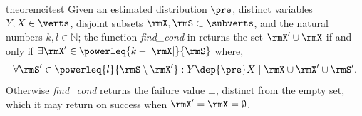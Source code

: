 \documentclass[accepted]{uai2026} %
\theoremstyle{plain}
\theoremstyle{definition}
\theoremstyle{remark}
\begin{document}
\begin{algorithm}[t]
  \caption{Association Mining}\label{alg:assoc-mine}
\end{algorithm}


\begin{restatable}{theorem}{citest}
  \label{thm:citest}
  Given an estimated distribution $\pre$, distinct variables
  $Y,X\in\verts$, disjoint subsets $\rmX,\rmS\subset\subverts$, and the
  natural numbers $k,l\in\mathbb{N}$; the function
  \textit{find\_cond} in  returns the set
  $\rmX'\cup\rmX$ if and only if
  $\exists \rmX' \in \powerleq{k-|\rmX|}{\rmS}$ where,
  \begin{equation}
    \label{eq:25}
    \forall \rmS' \in \powerleq{l}{\rmS \setminus \rmX'} :
    Y \dep{\pre} X \mid \rmX \cup \rmX' \cup \rmS'.
  \end{equation}
  Otherwise \textit{find\_cond} returns the failure value $\bot$,
  distinct from the empty set, which it may return on success when
  $\rmX'=\rmX=\emptyset$.
\end{restatable}
\end{document}
